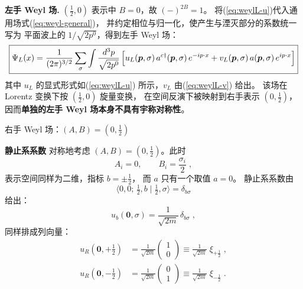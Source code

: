 \medskip
\noindent\textbf{左手 Weyl 场.}
$(\tfrac12,0)$ 表示中 $B=0$，故 $(-)^{2B}=1$。
将(\ref{eq:weylL-u})代入通用场式(\ref{eq:weyl-general})，
并约定相位与归一化，使产生与湮灭部分的系数统一写为
平面波上的 $1/\sqrt{2p^{0}}$，得到左手 Weyl 场：
\begin{equation}\label{eq:weylL-field}
  \boxed{
  \Psi_{L}(x)
  = \frac{1}{(2\pi)^{3/2}}\sum_{\sigma}\int\frac{d^{3}p}{\sqrt{2p^{0}}}\,
    \Bigl[u_{L}(\boldsymbol{p},\sigma)\,a^{c\dagger}(\boldsymbol{p},\sigma)\,e^{-ip\cdot x}
         + v_{L}(\boldsymbol{p},\sigma)\,a(\boldsymbol{p},\sigma)\,e^{ip\cdot x}\Bigr]
  }
\end{equation}
其中 $u_{L}$ 的显式形式如(\ref{eq:weylL-u}) 所示，$v_{L}$ 由(\ref{eq:weylL-v}) 给出。
该场在 Lorentz 变换下按 $(\tfrac12,0)$ 旋量变换，
在空间反演下被映射到右手表示 $(0,\tfrac12)$，
因而\textbf{单独的左手 Weyl 场本身不具有宇称对称性}。
\begin{center}
    \vspace{2ex}
     \large 右手 Weyl 场：$(A,B)=(0,\tfrac12)$
    \vspace{2ex}
\end{center}
\textbf{静止系系数}
对称地考虑 $(A,B)=(0,\tfrac12)$。此时
\[
  A_i = 0,\qquad B_i = \frac{\sigma_i}{2}\;,
\]
表示空间同样为二维，指标 $b=\pm\tfrac12$，
而 $a$ 只有一个取值 $a=0$。
静止系系数由
\[
  \langle 0,0;\,\tfrac12,b\mid\tfrac12,\sigma\rangle = \delta_{b\sigma}
\]
给出：
\begin{equation}\label{eq:weylR-u0}
  u_{b}(\mathbf{0},\sigma)
  = \frac{1}{\sqrt{2m}}\,\delta_{b\sigma}\;,
\end{equation}
同样排成列向量：
\begin{align}
  u_{R}(\mathbf{0},+\tfrac12)
  &= \frac{1}{\sqrt{2m}}
  \begin{pmatrix}1\\0\end{pmatrix}
  \equiv \frac{1}{\sqrt{2m}}\;\xi_{+\frac12}\;,\\[2pt]
  u_{R}(\mathbf{0},-\tfrac12)
  &= \frac{1}{\sqrt{2m}}
  \begin{pmatrix}0\\1\end{pmatrix}
  \equiv \frac{1}{\sqrt{2m}}\;\xi_{-\frac12}\;.
\end{align}

